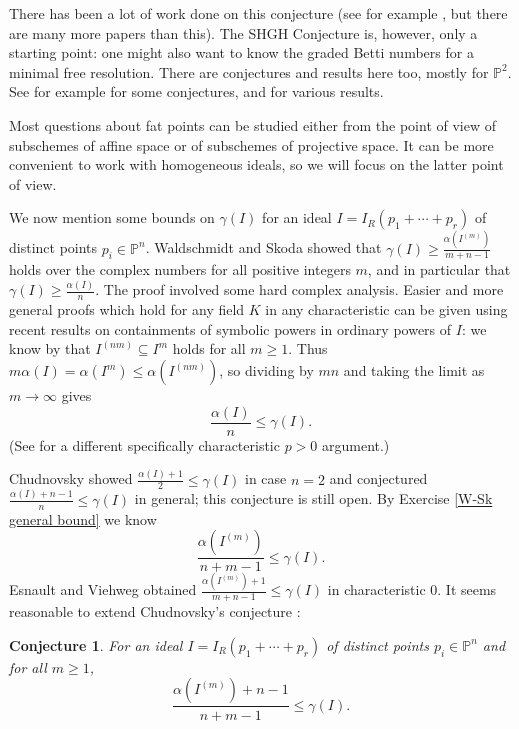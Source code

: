 \documentclass[11pt,twoside]{amsart}
\numberwithin{equation}{section}
\newtheorem{conjecture}[theorem]{Conjecture}
\theoremstyle{definition}
\begin{document}
There has been a lot of work done on this conjecture (see for example
\cite{refAH, refCM, refHR}, but there are many more papers than this). 
The SHGH Conjecture is, however, only a starting point: 
one might also want to know the graded Betti 
numbers for a minimal free resolution. There are conjectures and results here too,
mostly for ${\mathbb{P}^{2}}$. See for example \cite{refIGC} for some conjectures, and
\cite{refBI, refC, refFHH, refGHI, refGI, refFreeRes, refHHF, refIda} for various results.

Most questions about fat points can be studied either from the point of view of subschemes of affine space
or of subschemes of projective space. It can be more convenient to work with homogeneous ideals,
so we will focus on the latter point of view.

We now mention some bounds on $\gamma(I)$ for an ideal $I=I_R(p_1+\cdots+p_r)$ of 
distinct points $p_i\in{\mathbb{P}^{n}}$.
Waldschmidt and Skoda \cite{refW, refW2, refSk} 
showed that $\gamma(I)\geq \frac{\alpha(I^{(m)})}{m+n-1}$ holds
over the complex numbers for all positive integers $m$, and in particular
that $\gamma(I)\geq \frac{\alpha(I)}{n}$. The proof involved some hard complex analysis.
Easier and more general proofs which hold for any field ${K}$ in any characteristic
can be given using recent results on containments of
symbolic powers in ordinary powers of $I$: we know by \cite{refELS, refHH} that
$I^{(nm)}\subseteq I^m$ holds for all $m\geq1$. 
Thus $m\alpha(I)=\alpha(I^m)\leq\alpha(I^{(nm)})$, so dividing by $mn$ and taking the limit as $m\to\infty$ gives
$$\frac{\alpha(I)}{n}\leq\gamma(I).$$
(See \cite{refSc} for a different specifically characteristic $p>0$ argument.)

Chudnovsky \cite{refCh} showed $\frac{\alpha(I)+1}{2}\leq\gamma(I)$ in case $n=2$ and
conjectured $\frac{\alpha(I)+n-1}{n}\leq\gamma(I)$ in general; this conjecture is still open.
By Exercise \ref{W-Sk general bound} we know 
$$\frac{\alpha(I^{(m)})}{n+m-1}\leq\gamma(I).$$
Esnault and Viehweg \cite{refEV} obtained $\frac{\alpha(I^{(m)})+1}{m+n-1}\leq\gamma(I)$ in characteristic 0.
It seems reasonable to extend Chudnovsky's conjecture \cite[Question 4.2.1]{refHaHu}:

\begin{conjecture}\label{genChud}
For an ideal $I=I_R(p_1+\cdots+p_r)$ of 
distinct points $p_i\in{\mathbb{P}^{n}}$ and for all $m\geq 1$, 
$$\frac{\alpha(I^{(m)})+n-1}{n+m-1}\leq\gamma(I).$$
\end{conjecture}
\end{document}
